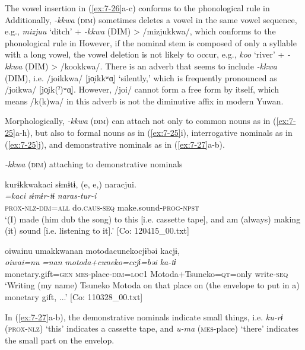 The vowel insertion in (\ref{ex:7-26}a-c) conforms to the phonological rule in  Additionally, \textit{{}-kkwa} (\textsc{dim}) sometimes deletes a vowel in the same vowel sequence, e.g., \textit{mizjuu} ‘ditch’ + \textit{{}-kkwa} (DIM) > /mizjukkwa/, which conforms to the phonological rule in  However, if the nominal stem is composed of only a syllable with a long vowel, the vowel deletion is not likely to occur, e.g., \textit{koo} ‘river’ + \textit{{}-kkwa} (DIM) > /kookkwa/. There is an adverb that seems to include \textit{{}-kkwa} (DIM), i.e. /joikkwa/ [jo̞ikkʷɑ̞] ‘silently,’ which is frequently pronounced as /joikwa/ [jo̞ik(ˀ)ʷɑ̞]. However, /joi/ cannot form a free form by itself, which means /k(k)wa/ in this adverb is not the diminutive affix in modern Yuwan.

  Morphologically, \textit{{}-kkwa} (\textsc{dim}) can attach not only to common nouns as in (\ref{ex:7-25}a-h), but also to formal nouns as in (\ref{ex:7-25}i), interrogative nominals as in (\ref{ex:7-25}j), and demonstrative nominals as in (\ref{ex:7-27}a-b).

\ea \label{ex:7:27}  \textit{{}-kkwa} (\textsc{dim}) attaching to demonstrative nominals

\ea \label{ex:7:a}{\TM}
\glll  kurɨkkwakaci  sɨmɨtɨ,  (e, e,)  naracjui.\\
\textit{=kaci}  \textit{sɨmɨr-tɨ}    \textit{naras-tur-i}\\
\textsc{prox}-\textsc{nlz}-\textsc{dim}=\textsc{all}  do.\textsc{caus}-\textsc{seq}    make.sound-\textsc{prog}-\textsc{npst}\\
\glt ‘(I) made (him dub the song) to this [i.e. cassette tape], and am (always) making (it) sound [i.e. listening to it].’ [Co: 120415\_00.txt]

\ex \label{ex:7:b}{\TM}
\glll  {\textbar}oiwai{\textbar}nu  umakkwanan  motodacunekocjɨbəi kacjɨ,    \\
\textit{oiwai=nu}  \textit{=nan}  \textit{motoda+cuneko=ccjɨ=bəi}  \textit{ka-tɨ}\\
monetary.gift=\textsc{gen}  \textsc{mes}-place-\textsc{dim}=\textsc{loc}1  Motoda+Tsuneko=\textsc{qt}=only       write-\textsc{seq}    \\
\glt ‘Writing (my name) Tsuneko Motoda on that place on (the envelope to put in a) monetary gift, ...’ [Co: 110328\_00.txt]

\z
\z

In (\ref{ex:7-27}a-b), the demonstrative nominals indicate small things, i.e. \textit{ku-rɨ} (\textsc{prox}-\textsc{nlz}) ‘this’ indicates a cassette tape, and \textit{u-ma} (\textsc{mes}-place) ‘there’ indicates the small part on the envelop.

